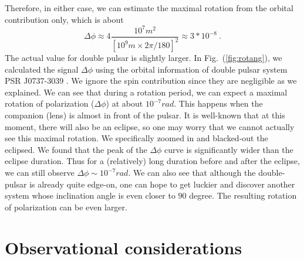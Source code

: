 \documentclass[aps,showpacs,twocolumn,floats,prd,superscriptaddress,nofootinbib]{revtex4-1}
\begin{document}
Therefore, in either case, we can estimate the maximal rotation from the orbital contribution only, which is about\begin{equation}
\Delta\phi \approx 4 \frac{10^7 m^2}{\left[  10^9m\times  2\pi / 180 \right]^2}\approx 3*10^{-8}~.
\end{equation}
The actual value for double pulsar is slightly larger.
In Fig.~(\ref{fig:rotang}), we calculated the signal $\Delta \phi$ using the orbital information of double pulsar system PSR J0737-3039 \cite{KraSta97}. 
We ignore the spin contribution since they are negligible as we explained. 
We can see that during a rotation period, we can expect a maximal rotation of polarization ($\Delta\phi$) at about $10^{-7} rad$. 
This happens when the companion (lens) is almost in front of the pulsar.
It is well-known that at this moment, there will also be an eclipse, so one may worry that we cannot actually see this maximal rotation.
We specifically zoomed in and blacked-out the eclipsed.
We found that the peak of the $\Delta\phi$ curve is significantly wider than the eclipse duration.
Thus for a (relatively) long duration before and after the eclipse, we can still observe $\Delta\phi\sim10^{-7}rad$.
We can also see that although the double-pulsar is already quite edge-on, one can hope to get luckier and discover another system whose inclination angle is even closer to $90$ degree.
The resulting rotation of polarization can be even larger.





\section{Observational considerations}
\label{sec-obs}
\end{document}

